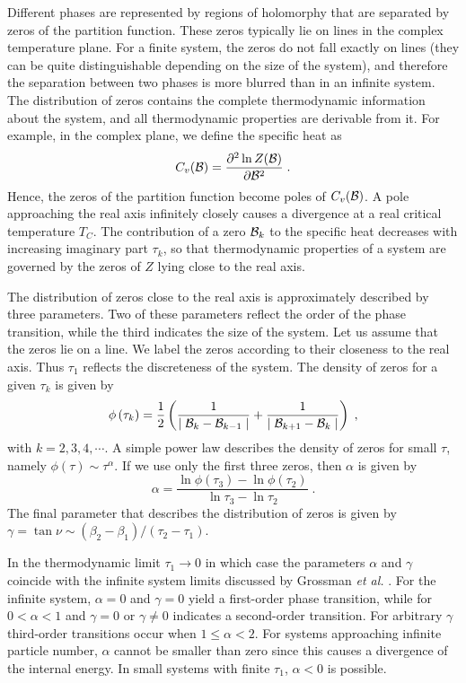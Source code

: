 \documentclass[preprint,rmp,aps,floatfix]{revtex4}
\begin{document}
Different phases are represented by regions of holomorphy that are
separated by zeros of the partition function. These zeros typically lie
on lines in the complex temperature plane. For a finite system, the zeros
do not fall exactly on lines (they can be quite distinguishable depending
on the size of the system), and therefore the separation between two 
phases is more blurred than in an infinite system. The distribution of zeros
contains the complete thermodynamic information about the system, and 
all thermodynamic properties are derivable from it. For example, in the
complex plane, we define the specific heat as
\begin{equation}
C_v({\cal B})=\frac{\partial^2 \ln Z({\cal B})}{\partial {\cal B}^2}\;.
\end{equation}
Hence, the zeros of the partition function become poles of $C_v({\cal B})$. 
A pole approaching the real axis  infinitely closely causes a divergence
at a real critical temperature $T_C$. The contribution of a zero ${\cal B}_k$
to the specific heat decreases with increasing imaginary part $\tau_k$, so 
that thermodynamic properties of a system are governed by the zeros of 
$Z$ lying close to the real axis. 

The distribution of zeros close to the real axis is approximately described
by three parameters. Two of these parameters reflect the order of the
phase transition, while the third indicates the size of the system. 
Let us assume that the zeros lie on a line. We label the zeros according
to their closeness to the real axis. Thus $\tau_1$ reflects the discreteness
of the system. The density of zeros for a given $\tau_k$ is given by
\begin{equation}
\phi\left(\tau_k\right)=\frac{1}{2}
\left(\frac{1}{\mid {\cal B}_k -{\cal B}_{k-1}\mid} + 
\frac{1}{\mid {\cal B}_{k+1}-{\cal B}_k \mid}\right)\;,
\end{equation}
with $k=2,3,4,\cdots$. A simple power law describes the density of
zeros for small $\tau$, namely $\phi(\tau)\sim \tau^\alpha$. If we use
only the first three zeros, then $\alpha$ is given by
\begin{equation}
\alpha=\frac{\ln \phi(\tau_3) - \ln\phi(\tau_2)}{\ln\tau_3 -\ln\tau_2}\;.
\end{equation}
The final parameter that describes the distribution of zeros is given
by $\gamma=\tan\nu\sim (\beta_2-\beta_1)/(\tau_2-\tau_1)$. 

In the thermodynamic limit $\tau_1\rightarrow 0$ in which case the parameters
$\alpha$ and $\gamma$ coincide with the infinite system limits discussed 
by Grossman {\it et al.} \cite{gr67,gr69,gl69}. For the infinite system,
$\alpha=0$ and $\gamma=0$ yield a first-order phase transition, while
for $0<\alpha<1$ and $\gamma=0$ or $\gamma\ne 0$ indicates a second-order
transition. For arbitrary $\gamma$ third-order transitions occur when 
$1 \le \alpha < 2$. For systems approaching infinite particle number, 
$\alpha$ cannot be smaller than zero since this causes a divergence of the
internal energy. In small systems with finite $\tau_1$, $\alpha<0$ is 
possible. 
\end{document}
